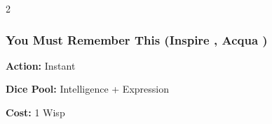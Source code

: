 \begin{multicols}{2}

\subsubsection*{You Must Remember This (Inspire \textbullet\textbullet, Acqua \textbullet)}

\noindent \textbf{Action:} Instant 

\noindent \textbf{Dice Pool:} Intelligence + Expression 

\noindent \textbf{Cost:} 1 Wisp


\end{multicols}

